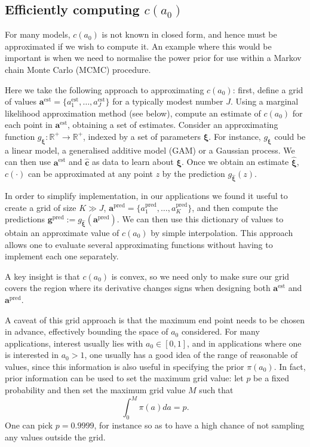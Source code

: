\documentclass[a4paper, notitlepage, 11pt]{article}
\begin{document}
\subsection{Efficiently computing $c(a_0)$}

For many models, $c(a_0)$ is not known in closed form, and hence must be approximated if we wish to compute it.
An example where this would be important is when we need to normalise the power prior for use within a Markov chain Monte Carlo (MCMC) procedure.

Here we take the following approach to approximating $c(a_0)$: first, define a grid of values $\boldsymbol a^{\text{est}} = \{ a^{\text{est}}_1, \ldots, a^{\text{est}}_J \}$ for a typically modest number $J$.
Using a marginal likelihood approximation method (see below), compute an estimate of $c(a_0)$ for each point in $\boldsymbol a^{\text{est}}$, obtaining a set of estimates.
Consider an approximating function $g_{\boldsymbol\xi} : \mathbb{R}^+ \to \mathbb{R}^+$, indexed by a set of parameters $\boldsymbol\xi$.
For instance, $g_{\boldsymbol\xi}$ could be a linear model, a generalised additive model (GAM) or a Gaussian process.
We can then use  $\boldsymbol a^{\text{est}}$ and $\hat{\boldsymbol c}$ as data to learn about $\boldsymbol\xi$.
Once we obtain an estimate  $\hat{\boldsymbol \xi}$, $c(\cdot)$ can be approximated at any point $z$ by the prediction $g_{\hat{\boldsymbol \xi}}(z)$.

In order to simplify implementation, in our applications we found it useful to create a grid of size $K \gg J$, $\boldsymbol a^{\text{pred}} = \{ a^{\text{pred}}_1, \ldots, a^{\text{pred}}_K \}$, and then compute the predictions $\boldsymbol g^{\text{pred}} := g_{\hat{\boldsymbol \xi}}( \boldsymbol a^{\text{pred}} )$.
We can then use this dictionary of values to obtain an approximate value of $c(a_0)$ by simple interpolation.
This approach allows one to evaluate several approximating functions without having to implement each one separately.

A key insight is that $c(a_0)$ is convex, so we need only to make sure our grid covers the region where its derivative changes signs when designing both $\boldsymbol a^{\text{est}}$ and $\boldsymbol a^{\text{pred}}$.

A caveat of this grid approach is that the maximum end point needs to be chosen in advance, effectively bounding the space of $a_0$ considered. 
For many applications, interest usually lies with $a_0 \in [0, 1]$, and in applications where one is interested in $a_0 > 1$, one usually has a good idea of the range of reasonable of values, since this information is also useful in specifying the prior $\pi(a_0)$.
In fact, prior information can be used to set the maximum grid value: let $p$ be a fixed probability and then set the maximum grid value $M$ such that
\[ \int_0^M \pi(a) da = p. \]
One can pick $p = 0.9999$, for instance so as to have a high chance of not sampling any values outside the grid.
\end{document}
